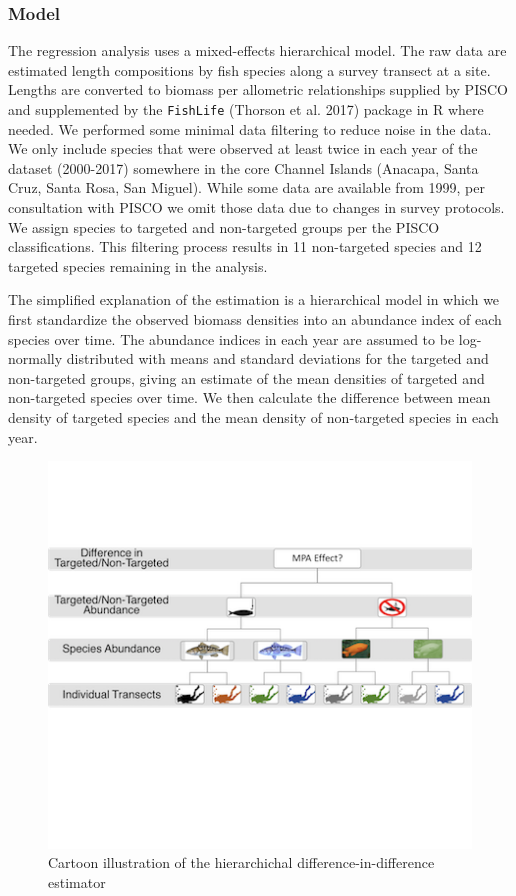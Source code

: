 \documentclass[]{article}
\begin{document}
\hypertarget{model}{%
\subsubsection{Model}\label{model}}

The regression analysis uses a mixed-effects hierarchical model. The raw data are estimated length compositions by fish species along a survey transect at a site. Lengths are converted to biomass per allometric relationships supplied by PISCO and supplemented by the \texttt{FishLife} (Thorson et al. 2017) package in R where needed. We performed some minimal data filtering to reduce noise in the data. We only include species that were observed at least twice in each year of the dataset (2000-2017) somewhere in the core Channel Islands (Anacapa, Santa Cruz, Santa Rosa, San Miguel). While some data are available from 1999, per consultation with PISCO we omit those data due to changes in survey protocols. We assign species to targeted and non-targeted groups per the PISCO classifications. This filtering process results in 11 non-targeted species and 12 targeted species remaining in the analysis.

The simplified explanation of the estimation is a hierarchical model in which we first standardize the observed biomass densities into an abundance index of each species over time. The abundance indices in each year are assumed to be log-normally distributed with means and standard deviations for the targeted and non-targeted groups, giving an estimate of the mean densities of targeted and non-targeted species over time. We then calculate the difference between mean density of targeted species and the mean density of non-targeted species in each year.

\newpage
\begin{figure}
\includegraphics[width=6in]{figs/estimation-cartoon} \caption{Cartoon illustration of the hierarchichal difference-in-difference estimator}\label{fig:cartoon}
\end{figure}
\end{document}
